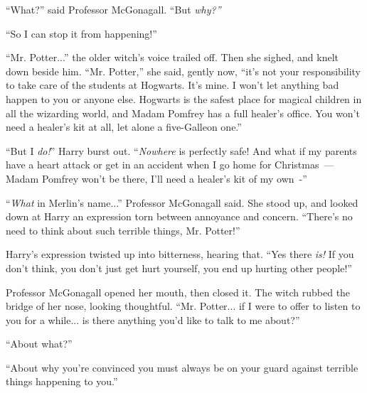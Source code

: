 ``What?'' said Professor McGonagall. ``But \emph{why?''}

``So I can stop it from happening!''

``Mr. Potter...'' the older witch's voice trailed off. Then she sighed, and knelt down beside him. ``Mr. Potter,'' she said, gently now, ``it's not your responsibility to take care of the students at Hogwarts. It's mine. I won't let anything bad happen to you or anyone else. Hogwarts is the safest place for magical children in all the wizarding world, and Madam Pomfrey has a full healer's office. You won't need a healer's kit at all, let alone a five-Galleon one.''

``But I \emph{do!}'' Harry burst out. ``\emph{Nowhere} is perfectly safe! And what if my parents have a heart attack or get in an accident when I go home for Christmas~--- Madam Pomfrey won't be there, I'll need a healer's kit of my own~-''

``\emph{What} in Merlin's name...'' Professor McGonagall said. She stood up, and looked down at Harry an expression torn between annoyance and concern. ``There's no need to think about such terrible things, Mr. Potter!''

Harry's expression twisted up into bitterness, hearing that. ``Yes there \emph{is!} If you don't think, you don't just get hurt yourself, you end up hurting other people!''

Professor McGonagall opened her mouth, then closed it. The witch rubbed the bridge of her nose, looking thoughtful. ``Mr. Potter... if I were to offer to listen to you for a while... is there anything you'd like to talk to me about?''

``About what?''

``About why you're convinced you must always be on your guard against terrible things happening to you.''

